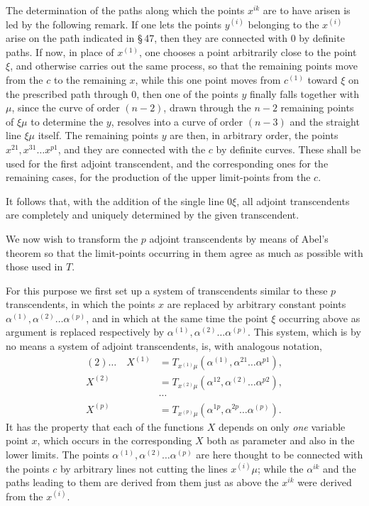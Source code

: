 \documentclass[10pt]{article}
\begin{document}
The determination of the paths along which the points \(x^{ik}\) are to have arisen is led by the following remark. If one lets the points \(y^{(i)}\) belonging to the \(x^{(i)}\) arise on the path indicated in \S\,47, then they are connected with \(0\) by definite paths. If now, in place of \(x^{(1)}\), one chooses a point arbitrarily close to the point \(\xi\), and otherwise carries out the same process, so that the remaining points move from the \(c\) to the remaining \(x\), while this one point moves from \(c^{(1)}\) toward \(\xi\) on the prescribed path through \(0\), then one of the points \(y\) finally falls together with \(\mu\), since the curve of order \((n-2)\), drawn through the \(n-2\) remaining points of \(\xi\mu\) to determine the \(y\), resolves into a curve of order \((n-3)\) and the straight line \(\xi\mu\) itself. The remaining points \(y\) are then, in arbitrary order, the points \(x^{21},x^{31}\ldots x^{p1}\), and they are connected with the \(c\) by definite curves. These shall be used for the first adjoint transcendent, and the corresponding ones for the remaining cases, for the production of the upper limit-points from the \(c\).

It follows that, with the addition of the single line \(0\xi\), all adjoint transcendents are completely and uniquely determined by the given transcendent.

We now wish to transform the \(p\) adjoint transcendents by means of Abel's theorem so that the limit-points occurring in them agree as much as possible with those used in \(T\).

For this purpose we first set up a system of transcendents similar to these \(p\) transcendents, in which the points \(x\) are replaced by arbitrary constant points \(\alpha^{(1)},\alpha^{(2)}\ldots\alpha^{(p)}\), and in which at the same time the point \(\xi\) occurring above as argument is replaced respectively by \(\alpha^{(1)},\alpha^{(2)}\ldots\alpha^{(p)}\). This system, which is by no means a system of adjoint transcendents, is, with analogous notation,
\[
\begin{aligned}
(2)\ldots\quad X^{(1)}&=T_{x^{(1)}\mu}(\alpha^{(1)},\alpha^{21}\ldots\alpha^{p1}),\\
X^{(2)}&=T_{x^{(2)}\mu}(\alpha^{12},\alpha^{(2)}\ldots\alpha^{p2}),\\[-0.35em]
&\cdots\\[-0.35em]
X^{(p)}&=T_{x^{(p)}\mu}(\alpha^{1p},\alpha^{2p}\ldots\alpha^{(p)}).
\end{aligned}
\]
It has the property that each of the functions \(X\) depends on only \emph{one} variable point \(x\), which occurs in the corresponding \(X\) both as parameter and also in the lower limits. The points \(\alpha^{(1)},\alpha^{(2)}\ldots\alpha^{(p)}\) are here thought to be connected with the points \(c\) by arbitrary lines not cutting the lines \(x^{(i)}\mu\); while the \(\alpha^{ik}\) and the paths leading to them are derived from them just as above the \(x^{ik}\) were derived from the \(x^{(i)}\).
\end{document}
